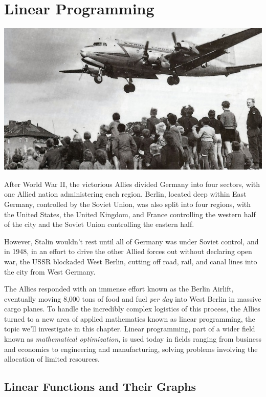 \documentclass[9pt,letter,twoside,openright]{memoir}
\begin{document}
\chapter{Linear Programming}
\begin{center}\includegraphics[width=\textwidth]{BerlinAirlift}\end{center}

After World War II, the victorious Allies divided Germany into four sectors, with one Allied nation administering each region.  Berlin, located deep within East Germany, controlled by the Soviet Union, was also split into four regions, with the United States, the United Kingdom, and France controlling the western half of the city and the Soviet Union controlling the eastern half.

However, Stalin wouldn't rest until all of Germany was under Soviet control, and in 1948, in an effort to drive the other Allied forces out without declaring open war, the USSR blockaded West Berlin, cutting off road, rail, and canal lines into the city from West Germany.

The Allies responded with an immense effort known as the Berlin Airlift, eventually moving 8,000 tons of food and fuel \textit{per day} into West Berlin in massive cargo planes.  To handle the incredibly complex logistics of this process, the Allies turned to a new area of applied mathematics known as linear programming, the topic we'll investigate in this chapter.  Linear programming, part of a wider field known as \textit{mathematical optimization}, is used today in fields ranging from business and economics to engineering and manufacturing, solving problems involving the allocation of limited resources.
\vfill
\pagebreak

\section{Linear Functions and Their Graphs}


\end{document}
